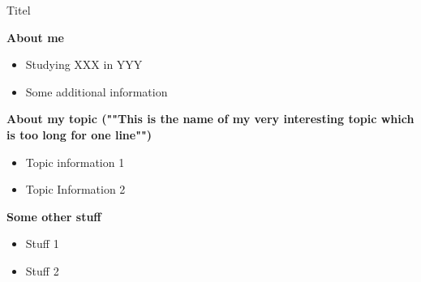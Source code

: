 \documentclass{beamer}
\newenvironment{itemlist}[1]{%
\begin{trivlist}
\item \textbf{\large #1}
\begin{itemize}
}{%
\end{itemize}
\end{trivlist}
}
\begin{document}
\begin{frame}{Titel}
\begin{itemlist}{About me}
  \item Studying XXX in YYY
  \item Some additional information
\end{itemlist}
\begin{itemlist}{About my topic \footnotesize \hfill \raggedleft (""This is the name of my very interesting topic which is too long for one line"") \\}
  \item Topic information 1
  \item Topic Information 2
\end{itemlist}
\begin{itemlist}{Some other stuff}
  \item Stuff 1
  \item Stuff 2
\end{itemlist}
\end{frame}
\end{document}
